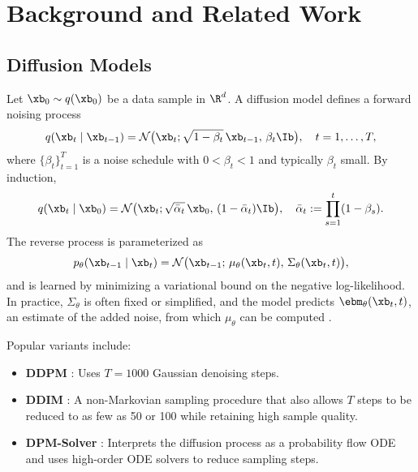 \documentclass[11pt,letterpaper]{article}
\begin{document}
\section{Background and Related Work}
\label{sec:background}

\subsection{Diffusion Models}

Let $\xb_0 \sim q(\xb_0)$ be a data sample in $\R^d$. A diffusion model defines a forward noising process
\begin{equation}
q(\xb_t \mid \xb_{t-1}) = \mathcal{N}\bigl(\xb_t;\sqrt{1-\beta_t}\,\xb_{t-1}, \,\beta_t \Ib\bigr), \quad t=1,\ldots,T,
\label{eq:gaussian-forward}
\end{equation}
where $\{\beta_t\}_{t=1}^T$ is a noise schedule with $0 < \beta_t < 1$ and typically $\beta_t$ small. By induction,
\begin{equation}
q(\xb_t \mid \xb_0) = \mathcal{N}\bigl(\xb_t; \sqrt{\bar\alpha_t}\,\xb_0,\, (1-\bar\alpha_t)\Ib \bigr), \quad \bar\alpha_t := \prod_{s=1}^t (1-\beta_s).
\end{equation}
The reverse process is parameterized as
\begin{equation}
p_\theta(\xb_{t-1}\mid \xb_t) = \mathcal{N}\bigl(\xb_{t-1};\,\mu_\theta(\xb_t,t),\,\Sigma_\theta(\xb_t,t)\bigr),
\label{eq:reverse-param}
\end{equation}
and is learned by minimizing a variational bound on the negative log-likelihood. In practice, $\Sigma_\theta$ is often fixed or simplified, and the model predicts $\ebm_\theta(\xb_t,t)$, an estimate of the added noise, from which $\mu_\theta$ can be computed \cite{ho2020denoising}.

Popular variants include:
\begin{itemize}[noitemsep,topsep=0pt]
    \item \textbf{DDPM} \cite{ho2020denoising}: Uses $T=1000$ Gaussian denoising steps.
    \item \textbf{DDIM} \cite{song2020denoising}: A non-Markovian sampling procedure that also allows $T$ steps to be reduced to as few as 50 or 100 while retaining high sample quality.
    \item \textbf{DPM-Solver} \cite{lu2022dpm}: Interprets the diffusion process as a probability flow ODE and uses high-order ODE solvers to reduce sampling steps.
\end{itemize}
\end{document}
